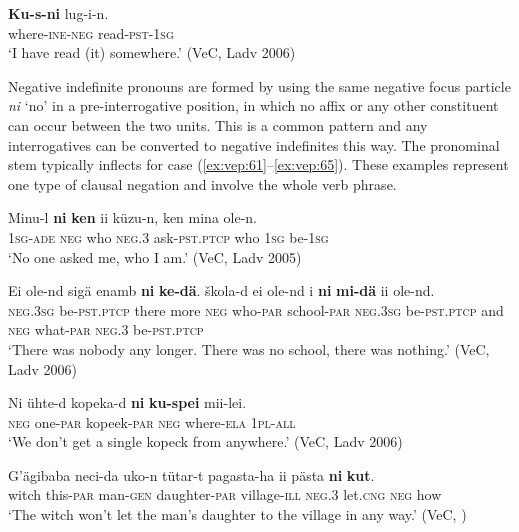 \documentclass[output=paper,colorlinks=true, citecolor=brown]{langscibook}
\begin{document}
\ea
    \label{ex:vep:60}
    \gll \textbf{Ku{}-s{}-ni}  lug{}-i{}-n. \\
         where{}-\textsc{ine}{}-\textsc{neg} read-\textsc{pst}{}-\textsc{1sg}\\
    \glt ‘I have read (it) somewhere.’ (VeC, Ladv 2006)
\z

Negative indefinite pronouns are formed by using the same negative focus particle \textit{ni} ‘no’ in a pre-interrogative position, in which no affix or any other constituent can occur between the two units. This is a common pattern and any interrogatives can be converted to negative indefinites this way. The pronominal stem typically inflects for case (\ref{ex:vep:61}–\ref{ex:vep:65}). These examples represent one type of clausal negation and involve the whole verb phrase.

\ea\label{ex:vep:61}
    \gll  Minu{}-l \textbf{ni} \textbf{ken} ii küzu{}-n, ken mina ole-n.\\
         \textsc{1sg}-\textsc{ade} \textsc{neg} who \textsc{neg.3} ask-\textsc{pst.ptcp} who \textsc{1sg} be-\textsc{1sg}\\
    \glt ‘No one asked me, who I am.’ (VeC, Ladv 2005)
\z

\ea
    \label{ex:vep:62}
    \gll Ei ole{}-nd sigä enamb \textbf{ni} \textbf{ke{}-dä}. škola{}-d ei ole{}-nd i \textbf{ni} \textbf{mi{}-dä} ii ole-nd. \\
        \textsc{neg.3sg} be-\textsc{pst.ptcp}  there more \textsc{neg} who-\textsc{par} school-\textsc{par} \textsc{neg.3sg} be{}-\textsc{pst.ptcp} and \textsc{neg} what-\textsc{par} \textsc{neg.3} be-\textsc{pst.ptcp}\\
    \glt ‘There was nobody any longer. There was no school, there was nothing.’ (VeC, Ladv 2006)
\z

\ea
    \label{ex:vep:63}
    \gll Ni ühte{}-d kopeka{}-d \textbf{ni} \textbf{ku{}-spei} mii{}-lei.\\
         \textsc{neg} one-\textsc{par} kopeek-\textsc{par} \textsc{neg} where\textsc{{}-ela} \textsc{1pl-all} \\
    \glt ‘We don’t get a single kopeck from anywhere.’ (VeC, Ladv 2006)
\z 

\ea
    \label{ex:vep:64}
    \gll G’ägibaba neci-da uko-n tütar-t pagasta-ha ii pästa \textbf{ni} \textbf{kut}. \\
         witch  this-\textsc{par} man\textsc{{}-gen} daughter-\textsc{par} village{}-\textsc{ill} \textsc{neg.3} let.\textsc{cng} \textsc{neg} how\\
    \glt ‘The witch won’t let the man’s daughter to the village in any way.’ (VeC, \citealt[125]{MSFOu70})
\z 
\end{document}
